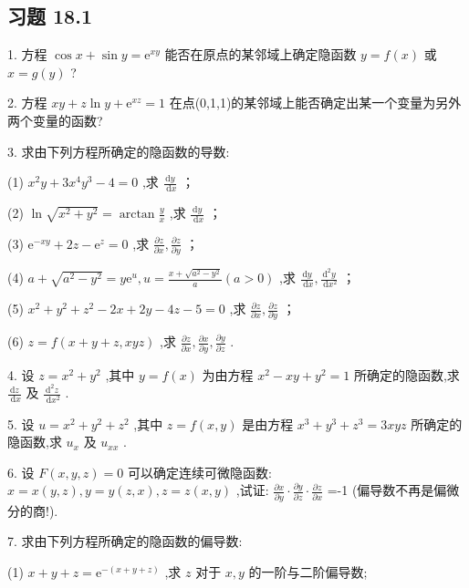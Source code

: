 \subsection{习题 18.1}

1. 方程 \(\cos x + \sin y = {\mathrm{e}}^{xy}\) 能否在原点的某邻域上确定隐函数 \(y = f\left( x\right)\) 或 \(x = g\left( y\right)\) ?

2. 方程 \({xy} + z\ln y + {\mathrm{e}}^{xz} = 1\) 在点(0,1,1)的某邻域上能否确定出某一个变量为另外两个变量的函数?

3. 求由下列方程所确定的隐函数的导数:

(1) \({x}^{2}y + 3{x}^{4}{y}^{3} - 4 = 0\) ,求 \(\frac{\mathrm{d}y}{\mathrm{\;d}x}\) ；

(2) \(\ln \sqrt{{x}^{2} + {y}^{2}} = \arctan \frac{y}{x}\) ,求 \(\frac{\mathrm{d}y}{\mathrm{\;d}x}\) ；

(3) \({\mathrm{e}}^{-{xy}} + {2z} - {\mathrm{e}}^{z} = 0\) ,求 \(\frac{\partial z}{\partial x},\frac{\partial z}{\partial y}\) ；

(4) \(a + \sqrt{{a}^{2} - {y}^{2}} = y{\mathrm{e}}^{u},u = \frac{x + \sqrt{{a}^{2} - {y}^{2}}}{a}\left( {a > 0}\right)\) ,求 \(\frac{\mathrm{d}y}{\mathrm{\;d}x},\frac{{\mathrm{d}}^{2}y}{\mathrm{\;d}{x}^{2}}\) ；

(5) \({x}^{2} + {y}^{2} + {z}^{2} - {2x} + {2y} - {4z} - 5 = 0\) ,求 \(\frac{\partial z}{\partial x},\frac{\partial z}{\partial y}\) ；

(6) \(z = f\left( {x + y + z,{xyz}}\right)\) ,求 \(\frac{\partial z}{\partial x},\frac{\partial x}{\partial y},\frac{\partial y}{\partial z}\) .

4. 设 \(z = {x}^{2} + {y}^{2}\) ,其中 \(y = f\left( x\right)\) 为由方程 \({x}^{2} - {xy} + {y}^{2} = 1\) 所确定的隐函数,求 \(\frac{\mathrm{d}z}{\mathrm{\;d}x}\) 及 \(\frac{{\mathrm{d}}^{2}z}{\mathrm{\;d}{x}^{2}}\) .

5. 设 \(u = {x}^{2} + {y}^{2} + {z}^{2}\) ,其中 \(z = f\left( {x,y}\right)\) 是由方程 \({x}^{3} + {y}^{3} + {z}^{3} = {3xyz}\) 所确定的隐函数,求 \({u}_{x}\) 及 \({u}_{xx}\) .

6. 设 \(F\left( {x,y,z}\right)  = 0\) 可以确定连续可微隐函数: \(x = x\left( {y,z}\right) ,y = y\left( {z,x}\right) ,z = z\left( {x,y}\right)\) ,试证: \(\frac{\partial x}{\partial y} \cdot  \frac{\partial y}{\partial z} \cdot  \frac{\partial z}{\partial x}\) =-1 (偏导数不再是偏微分的商!).

7. 求由下列方程所确定的隐函数的偏导数:

(1) \(x + y + z = {\mathrm{e}}^{-\left( {x + y + z}\right) }\) ,求 \(z\) 对于 \(x,y\) 的一阶与二阶偏导数;

